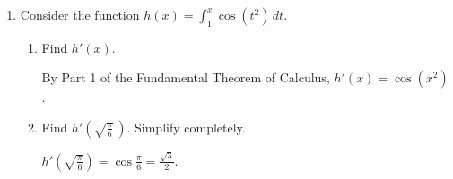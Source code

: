 \documentclass{article}
\begin{document}
\begin{enumerate}
\begin{enumerate}
\begin{enumerate}
        
        \item 
        \begin{problem}
            $j(x)=(\cos x)^{2x}$
        \end{problem}
        \pspace{\vfill}

        \begin{solution}
            This is a function of the form $f(x)^{g(x)}$, so we can use logarithmic differentiation. 

            \begin{align*}
                j(x) &= (\cos x)^{2x} \\
                \ln j(x) &= \ln\!\big[(\cos x)^{2x}\big] \\
                 &= 2x\ln(\cos x)
                \intertext{
                Differentiating both sides,
                }
                \frac{j'(x)}{j(x)} &= 2\ln(\cos x) - \frac{2x\sin x}{\cos x} \\
                j'(x) &= j(x)\Big[2\ln(\cos x) - \frac{2x\sin x}{\cos x}\Big] \\
                &= \boxed{2(\cos x)^{2x}\big[\ln(\cos x) - x\tan x\big]}
            \end{align*}
        \end{solution}
    \end{enumerate}
    
\newpage
        \item Consider the function $h(x)=\displaystyle \int_{1}^{x} \cos(t^2) \, dt$. 
        
        \begin{enumerate}
            \item 
            \begin{problem}
            Find $h'(x)$.
            \end{problem}
            \pspace{\vfill}

            \begin{solution}
                By Part 1 of the Fundamental Theorem of Calculus, $h'(x) = \boxed{\cos(x^2)}$.
            \end{solution}
            
            \item 
            \begin{problem}
            Find $h'\!\left(\sqrt{\frac{\pi}{6}}\,\right)$. Simplify completely.
            \end{problem}

            \begin{solution}
                $h'(\sqrt{\frac{\pi}{6}}) = \cos \frac{\pi}{6} = \boxed{\tfrac{\sqrt{3}}{2}}$.
            \end{solution}
        \end{enumerate}
    \end{enumerate}
    

\end{enumerate}
\end{document}
